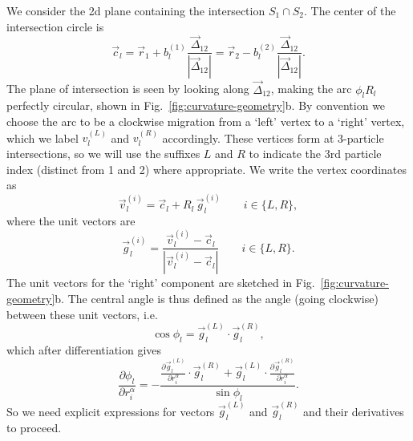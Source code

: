 We consider the 2d plane containing the intersection $S_1 \cap S_2$.
The center of the intersection circle is
\begin{equation}
  \vec{c}_l
  = \vec{r}_1 + b_l^{(1)} \frac{\vec{\Delta}_{12}}{|\vec{\Delta}_{12}|}
  = \vec{r}_2 - b_l^{(2)} \frac{\vec{\Delta}_{12}}{|\vec{\Delta}_{12}|}.
\end{equation}
The plane of intersection is seen by looking along $\vec{\Delta}_{12}$, making the arc $\phi_l R_l$ perfectly circular, shown in Fig.\ \ref{fig:curvature-geometry}b.
By convention we choose the arc to be a clockwise migration from a `left' vertex to a `right' vertex, which we label $v_l^{(L)}$ and $v_l^{(R)}$ accordingly.
These vertices form at 3-particle intersections, so we will use the suffixes $L$ and $R$ to indicate the 3rd particle index (distinct from 1 and 2) where appropriate.
We write the vertex coordinates as
\begin{equation}
  \vec{v}_l^{(i)} = \vec{c}_l + R_l \, \vec{g}_l^{(i)} \qquad i \in \{L,R\},
\end{equation}
where the unit vectors are
\begin{equation}
  \vec{g}_l^{(i)} =
  \frac
  {\vec{v}_l^{(i)} - \vec{c}_l}
  {|\vec{v}_l^{(i)} - \vec{c}_l|}
  \qquad i \in \{L,R\}.
\end{equation}
The unit vectors for the `right' component are sketched in Fig.\ \ref{fig:curvature-geometry}b.
The central angle is thus defined as the angle (going clockwise) between these unit vectors, i.e.
\begin{equation}
  \cos{\phi_l} = \vec{g}_l^{(L)} \cdot \vec{g}_l^{(R)},
\end{equation}
which after differentiation gives
\begin{equation}
  \frac{\partial \phi_l}{\partial r_i^\alpha} =
  - \frac
  {\frac{\partial \vec{g}_l^{(L)}}{\partial r_i^\alpha} \cdot \vec{g}_l^{(R)} +
   \vec{g}_l^{(L)} \cdot \frac{\partial \vec{g}_l^{(R)}}{\partial r_i^\alpha}}
  {\sin{\phi_l}}.
\end{equation}
So we need explicit expressions for vectors $\vec{g}_l^{(L)}$ and $\vec{g}_l^{(R)}$ and their derivatives to proceed.

